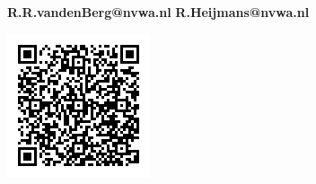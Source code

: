 \documentclass[portrait,a0paper,fontscale=0.31]{baposter}
\begin{document}
\begin{poster}
  {
  \begin{center}
  \vspace{1.25em}

  \textbf{R.R.vandenBerg@nvwa.nl}\linebreak
  \textbf{R.Heijmans@nvwa.nl}\linebreak
  \end{center}
  }


  {
  \vspace{-0.3em}
  \begin{center}
  \includegraphics[width=0.25\linewidth]{images/meegid_heidelberg_poultry.png}
  \end{center}
  }
\end{poster}
\end{document}
